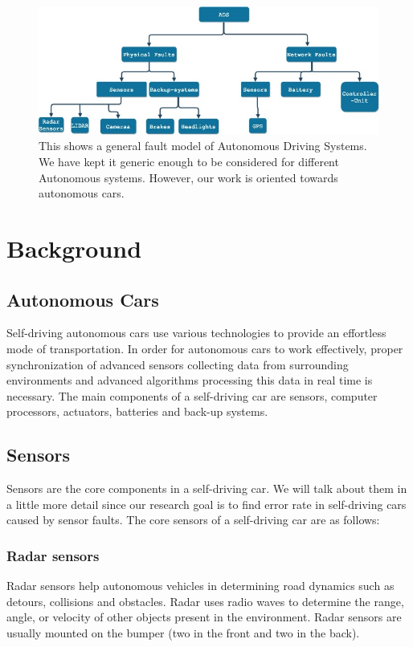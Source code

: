
\begin{figure}
	\centering
	\includegraphics[width=0.7\linewidth]{Fault-modelgeneral}
	\caption[Fault-model for ADS]{This shows a general fault model of Autonomous Driving Systems. We have kept it generic enough to be considered for different Autonomous systems. However, our work is oriented towards autonomous cars.}
	\label{fig:fault-modelgeneral}
\end{figure}
\section{Background} \label{background}
\subsection{ Autonomous Cars}
Self-driving autonomous cars use various technologies to provide an effortless mode of transportation. In order for autonomous cars to work effectively, proper synchronization of advanced sensors collecting data from surrounding environments and advanced algorithms processing this data in real time is necessary. The main components of a self-driving car are sensors, computer processors, actuators, batteries and back-up systems.

\subsection{Sensors}
Sensors are the core components in a self-driving car. We will talk about them in a little more detail since our research goal is to find error rate in self-driving cars caused by sensor faults. The core sensors of a self-driving car are as follows:

\smallskip
\subsubsection{Radar sensors}
Radar sensors help autonomous vehicles in determining road dynamics such as detours, collisions and obstacles. Radar uses radio waves to determine the range, angle, or velocity of other objects present in the environment. Radar sensors are usually mounted on the bumper (two in the front and two in the back).

